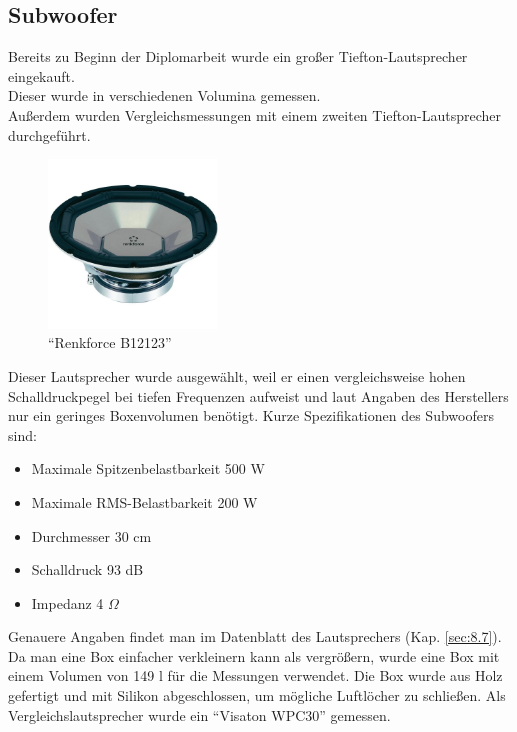\newpage
\subsection*{Subwoofer} \label{subsec:4.2.3}
Bereits zu Beginn der Diplomarbeit wurde ein großer Tiefton-Lautsprecher eingekauft.\\
Dieser wurde in verschiedenen Volumina gemessen.\\
Außerdem wurden Vergleichsmessungen mit einem zweiten Tiefton-Lautsprecher durchgeführt.
\begin{figure} [H]
	\centering
	\includegraphics[width=0.4\textwidth]{img/LSMessung/TT/renkforce_B12123.png}
	\caption[\enquote{Renkforce B12123}]{\enquote{Renkforce B12123}\footnotemark}
	\label{fig:4.2.3.1}
\end{figure}
Dieser Lautsprecher wurde ausgewählt, weil er einen vergleichsweise hohen Schalldruckpegel bei tiefen Frequenzen aufweist und laut Angaben des Herstellers nur ein geringes Boxenvolumen benötigt.
Kurze Spezifikationen des Subwoofers sind:
\begin{itemize}
	\item Maximale Spitzenbelastbarkeit 500 W
	\item Maximale RMS-Belastbarkeit 200 W
	\item Durchmesser 30 cm
	\item Schalldruck 93 dB
	\item Impedanz 4 $\Omega$
\end{itemize}
Genauere Angaben findet man im Datenblatt des Lautsprechers (Kap. \ref{sec:8.7}).
Da man eine Box einfacher verkleinern kann als vergrößern, wurde eine Box mit einem Volumen von 149 l für die Messungen verwendet.
Die Box wurde aus Holz gefertigt und mit Silikon abgeschlossen, um mögliche Luftlöcher zu schließen.
Als Vergleichslautsprecher wurde ein \enquote{Visaton WPC30} gemessen.

